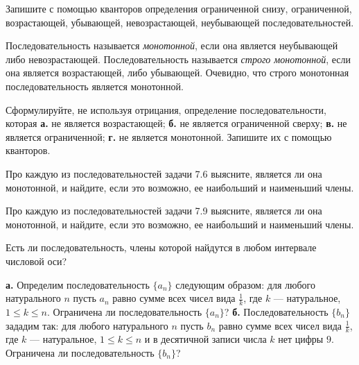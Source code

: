 \documentclass[a4paper, 12pt, num=24]{listok}
\begin{document}
\begin{problem}
	Запишите с помощью кванторов определения ограниченной снизу, ограниченной, возрастающей, убывающей, невозрастающей, неубывающей последовательностей.
\end{problem}
\begin{definition}
	Последовательность называется \textit{монотонной}, если она является неубывающей либо невозрастающей.
	Последовательность называется \textit{строго монотонной}, если она является возрастающей, либо убывающей.
	Очевидно, что строго монотонная последовательность является монотонной.
\end{definition}
\begin{problem}
	Сформулируйте, не используя отрицания, определение последовательности, которая
	\textbf{а.} не является возрастающей; \textbf{б.} не является ограниченной сверху;
	\textbf{в.} не является ограниченной; \textbf{г.} не является монотонной. Запишите их с помощью кванторов.
\end{problem}
\begin{problem}
	Про каждую из последовательностей задачи 7.6 выясните, является ли она монотонной, и найдите, если это возможно, ее наибольший и наименьший члены.
\end{problem}
\begin{problem}
	Про каждую из последовательностей задачи 7.9 выясните, является ли она монотонной, и найдите, если это возможно, ее наибольший и наименьший члены.
\end{problem}
\begin{problem}
	Есть ли последовательность, члены которой найдутся в любом интервале числовой оси?
\end{problem}
\begin{problem}
	\textbf{а.} Определим последовательность $\{a_n\}$ следующим образом:
	для любого натурального $n$ пусть $a_n$ равно сумме всех чисел вида $\frac1k$, где $k$ --- натуральное, $1 \le k \le n$.
	Ограничена ли последовательность $\{a_n\}$?
	\textbf{б.} Последовательность $\{b_n\}$ зададим так: для любого натурального $n$ пусть $b_n$ равно сумме всех чисел вида $\frac1k$,
	где $k$ --- натуральное, $1 \le k \le n$ и в десятичной записи числа $k$ нет цифры $9$. Ограничена ли последовательность $\{b_n\}$?
\end{problem}
\end{document}

